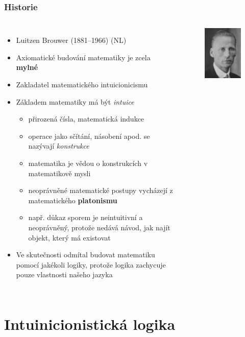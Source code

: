 \documentclass[aspectratio=169]{beamer}
\begin{document}
\begin{frame}
\frametitle{Historie}
\begin{columns}
\begin{itemize}
\item Luitzen Brouwer (1881--1966) (NL)
\item Axiomatické budování matematiky je zcela \textbf{mylné}
\item Zakladatel matematického intuicionicismu
\item Základem matematiky má být \textit{intuice}
    \begin{itemize}
    \item přirozená čísla, matematická indukce
    \item operace jako sčítání, násobení apod. se nazývají \textit{konstrukce}
    \item matematika je vědou o konstrukcích v matematikově mysli
    \item neoprávněné matematické postupy vycházejí z matematického \textbf{platonismu}
    \item např. důkaz sporem je neintuitivní a neoprávněný, protože nedává návod, jak najít objekt, který má existovat
    \end{itemize}
\item Ve skutečnosti odmítal budovat matematiku pomocí jakékoli logiky, protože logika zachycuje pouze vlastnosti našeho jazyka
\end{itemize}

\begin{figure}
\includegraphics[scale=0.45]{brouwer}
\end{figure}
\end{columns}
\end{frame}


\section{Intuinicionistická logika}
\end{document}
